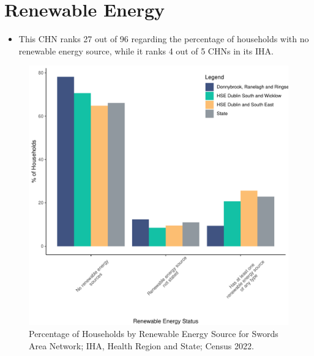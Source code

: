 \documentclass{article}
\begin{document}
\section{Renewable Energy}\label{sect:RE}
\begin{itemize}
\item This CHN ranks  27 out of 96 regarding the percentage of households with no renewable energy source, while it ranks   4 out of 5 CHNs in its IHA.
\end{itemize}
\begin{figure}[H]
	\centering
	\includegraphics[width = 140mm]{../figures/RenewableEnergyED.pdf}
	\caption{Percentage of Households by Renewable Energy Source for Swords Area Network; IHA, Health Region and State; Census 2022.}
	\label{fig:vbnv}
	\end{figure}
\end{document}
